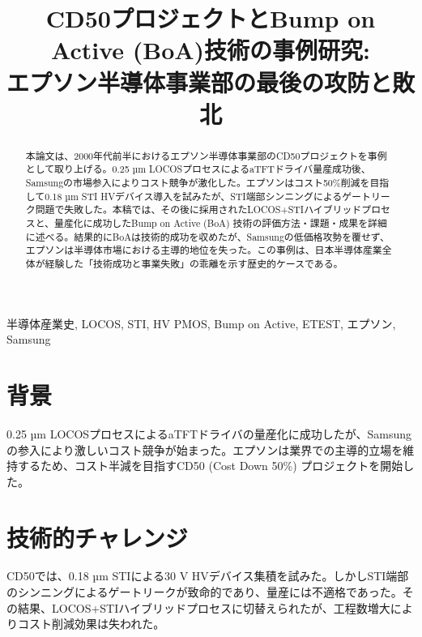 \documentclass[conference]{IEEEtran}
\begin{document}
\title{CD50プロジェクトとBump on Active (BoA)技術の事例研究:\\
エプソン半導体事業部の最後の攻防と敗北}

\author{%
}

\maketitle

\begin{abstract}
本論文は、2000年代前半におけるエプソン半導体事業部のCD50プロジェクトを事例として取り上げる。0.25 µm LOCOSプロセスによるaTFTドライバ量産成功後、Samsungの市場参入によりコスト競争が激化した。エプソンはコスト50\%削減を目指して0.18 µm STI HVデバイス導入を試みたが、STI端部シンニングによるゲートリーク問題で失敗した。本稿では、その後に採用されたLOCOS+STIハイブリッドプロセスと、量産化に成功したBump on Active (BoA) 技術の評価方法・課題・成果を詳細に述べる。結果的にBoAは技術的成功を収めたが、Samsungの低価格攻勢を覆せず、エプソンは半導体市場における主導的地位を失った。この事例は、日本半導体産業全体が経験した「技術成功と事業失敗」の乖離を示す歴史的ケースである。
\end{abstract}

\begin{IEEEkeywords}
半導体産業史, LOCOS, STI, HV PMOS, Bump on Active, ETEST, エプソン, Samsung
\end{IEEEkeywords}

\section{背景}
0.25 µm LOCOSプロセスによるaTFTドライバの量産化に成功したが、Samsungの参入により激しいコスト競争が始まった。エプソンは業界での主導的立場を維持するため、コスト半減を目指すCD50 (Cost Down 50\%) プロジェクトを開始した。

\section{技術的チャレンジ}
CD50では、0.18 µm STIによる30 V HVデバイス集積を試みた。しかしSTI端部のシンニングによるゲートリークが致命的であり、量産には不適格であった。その結果、LOCOS+STIハイブリッドプロセスに切替えられたが、工程数増大によりコスト削減効果は失われた。
\end{document}
